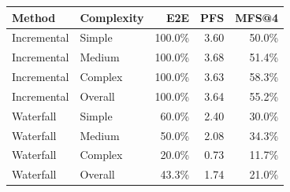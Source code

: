 \begin{tabular}{llrrr}
\toprule
Method & Complexity & E2E & PFS & MFS@4 \\
\midrule
Incremental & Simple & 100.0\% & 3.60 & 50.0\% \\
Incremental & Medium & 100.0\% & 3.68 & 51.4\% \\
Incremental & Complex & 100.0\% & 3.63 & 58.3\% \\
Incremental & Overall & 100.0\% & 3.64 & 55.2\% \\
Waterfall & Simple & 60.0\% & 2.40 & 30.0\% \\
Waterfall & Medium & 50.0\% & 2.08 & 34.3\% \\
Waterfall & Complex & 20.0\% & 0.73 & 11.7\% \\
Waterfall & Overall & 43.3\% & 1.74 & 21.0\% \\
\bottomrule
\end{tabular}
